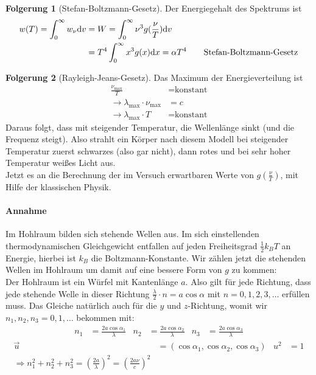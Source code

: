 \documentclass[oneside]{book}
\theoremstyle{definition}
\newtheorem*{folgerung*}{Folgerung}
\renewcommand{\d}{\mathrm d}
\newcommand{\const}{\text{konstant}}
\begin{document}
\begin{folgerung*}[Stefan-Boltzmann-Gesetz]
Der Energiegehalt des Spektrums ist
\begin{align*}
	w(T) =\int_{0}^{\infty} w_\nu \d v &= W = \int_0^\infty \nu^3 g(\frac{\nu}{T}) \d v\\
	&= T^4 \int_0^\infty x^3 g(x) \d x = \alpha T^4 \text{\qquad Stefan-Boltzmann-Gesetz}
\end{align*}
\end{folgerung*}

\begin{folgerung*}[Rayleigh-Jeans-Gesetz]
Das Maximum der Energieverteilung  ist
\begin{align*}
\frac{\nu_\text{max}}{T} &= \const\\
\rightarrow \lambda_\text{max} \cdot \nu_\text{max} &= c\\
\rightarrow \lambda_\text{max} \cdot T &= \const
\end{align*}
Daraus folgt, dass mit steigender Temperatur, die Wellenlänge sinkt (und die Frequenz steigt). Also strahlt ein Körper nach diesem Modell bei steigender Temperatur zuerst schwarzes (also gar nicht), dann rotes und bei sehr hoher Temperatur weißes Licht aus.\\
Jetzt es an die Berechnung der im Versuch erwartbaren Werte von $g(\frac{\nu}{T})$, mit Hilfe der klassischen Physik.
\paragraph{Annahme} Im Hohlraum bilden sich stehende Wellen aus. Im sich einstellenden thermodynamischen Gleichgewicht entfallen auf jeden Freiheitsgrad $\frac12 k_B T$ an Energie, hierbei ist $k_B$ die Boltzmann-Konstante. Wir zählen jetzt die stehenden Wellen im Hohlraum um damit auf eine bessere Form von $g$ zu kommen:\\
Der Hohlraum ist ein Würfel mit Kantenlänge $a$. Also gilt für jede Richtung, dass jede stehende Welle in dieser Richtung $\frac{\lambda}{2}\cdot n = a \cos \alpha$ mit $n = 0, 1, 2, 3, \dots$ erfüllen muss. Das Gleiche natürlich auch für die $y$ und $z$-Richtung, womit wir $n_1, n_2, n_3 = 0, 1, \dots$ bekommen mit:
\begin{align*}
n_1 &= \frac{2 a \cos \alpha_1}{\lambda} & n_2 &= \frac{2 a \cos \alpha_2}{\lambda} & n_3 &= \frac{2 a \cos \alpha_3}{\lambda}
\end{align*}
\begin{align*}
\vec{u} &= (\cos \alpha_1, \cos \alpha_2, \cos \alpha_3) & u^2 &= 1\\
\Rightarrow n_1^2 + n_2^2 + n_3^2 = (\frac{2a}{\lambda})^2 = (\frac{2 a \nu}{c})^2
\end{align*}


\end{folgerung*}
\end{document}
